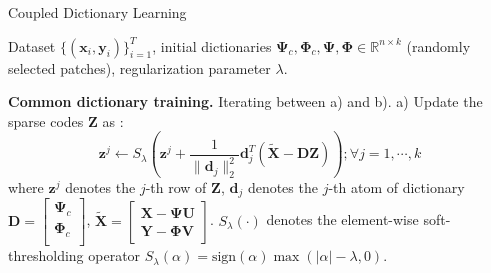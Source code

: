 \documentclass{article}
\begin{document}
%
\begin{algorithm}[t] %
	\caption{Coupled Dictionary Learning}
	\label{Alg:CoupledBCD}
		\begin{algorithmic}[1]	
			\renewcommand{\algorithmicrequire}{\textbf{Input:}}
			\renewcommand{\algorithmicensure}{\textbf{Output:}}
			\REQUIRE 
			Dataset 
			$\{(\mathbf{x}_i, \mathbf{y}_i) \}_{i=1}^T$, initial dictionaries $\boldsymbol{\Psi}_{c}, \boldsymbol{\Phi}_{c},\boldsymbol{\Psi}, \boldsymbol{\Phi} \in \mathbb{R}^{n \times k}$ (randomly selected patches), regularization parameter $\lambda$.
			
			
			\renewcommand{\algorithmicrequire}{\textbf{Optimization:}}
			\REQUIRE		
			\STATE
			\textbf{Common dictionary training.} Iterating between a) and b).
			\STATE
			a) Update the sparse codes $\mathbf{Z}$ as :
			\begin{equation*}
			\mathbf{z}^j \leftarrow S_\lambda\left( \mathbf{z}^j + \frac{1}{\|\mathbf{d}_j \|_2^2} \mathbf{d}_j^T (\widetilde{\mathbf{X}} - \mathbf{D} \mathbf{Z}) \right) ; \forall j=1,\cdots, k
			\end{equation*}
			where 
			$\mathbf{z}^j$ denotes the $j$-th row of $\mathbf{Z}$, $\mathbf{d}_j$ denotes the $j$-th atom of dictionary $\mathbf{D}	= 
			\begin{bmatrix}
			\boldsymbol{\Psi}_{c}  \\
			\boldsymbol{\Phi}_{c}  \\
			\end{bmatrix} $,
			$\widetilde{\mathbf{X}} = 
			\begin{bmatrix} 
			\mathbf{X} - \boldsymbol{\Psi} \mathbf{U} \\ 
			\mathbf{Y} -  \boldsymbol{\Phi} \mathbf{V}
			\end{bmatrix} $.
			$S_\lambda(\cdot)$ denotes the element-wise soft-thresholding operator
			$S_\lambda(\alpha) = \text{sign}(\alpha) \max(|\alpha|-\lambda, 0)$.
			

\end{algorithmic}
\end{algorithm}
\end{document}
